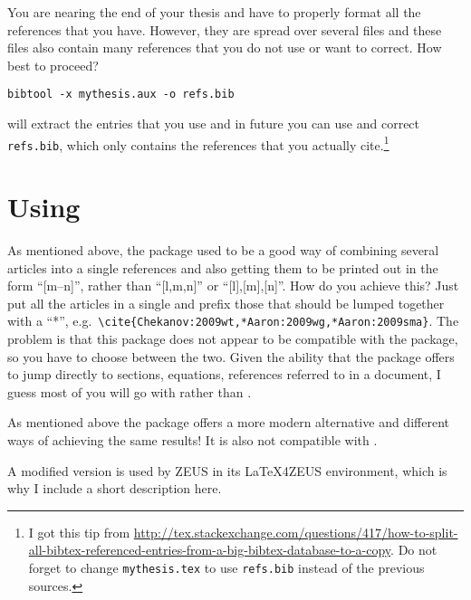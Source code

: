 You are nearing the end of your thesis and have to properly format all
the references that you have. However, they are spread over several
files and these files also contain many references that you do not use
or want to correct. How best to proceed?
\begin{verbatim}
bibtool -x mythesis.aux -o refs.bib
\end{verbatim}
will extract the entries that you use and in future you can use and
correct \texttt{refs.bib}, which only contains the references that you
actually cite.\footnote{%
I got this tip from
\url{http://tex.stackexchange.com/questions/417/how-to-split-all-bibtex-referenced-entries-from-a-big-bibtex-database-to-a-copy}.
Do not forget to change \texttt{mythesis.tex} to use
\texttt{refs.bib} instead of the previous sources.}


\section{Using }
\label{sec:ref:mcite}

As mentioned above, the  package used to be a good way
of combining several articles into a single references and also
getting them to be printed out in the form \enquote{[m--n]}, rather
than \enquote{[l,m,n]} or \enquote{[l],[m],[n]}. How do you achieve
this?  Just put all the articles in a single  and prefix
those that should be lumped together with a \enquote{*}, e.g.\
\verb+\cite{Chekanov:2009wt,*Aaron:2009wg,*Aaron:2009sma}+.  The
problem is that this package does not appear to be compatible with the
 package, so you have to choose between the
two. Given the ability that the \Package{hyperref} package offers to
jump directly to sections, equations, references referred to in a
document, I guess most of you will go with \Package{hyperref} rather
than \Package{mcite}.

As mentioned above the  package offers a
more modern alternative and different ways of achieving the same
results! It is also not compatible with .

A modified version \Package{mcite} is used by ZEUS in its LaTeX4ZEUS
environment, which is why I include a short description here.

